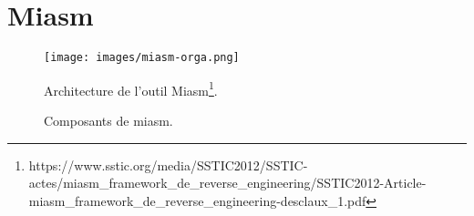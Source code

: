 \chapter{Miasm}
\begin{figure}[h]
    \centering
    \texttt{[image: images/miasm-orga.png]}
    \caption{Composants de miasm.}
    Architecture de l'outil Miasm\footnote{https://www.sstic.org/media/SSTIC2012/SSTIC-actes/miasm\_framework\_de\_reverse\_engineering/SSTIC2012-Article-miasm\_framework\_de\_reverse\_engineering-desclaux\_1.pdf}.
\end{figure}
